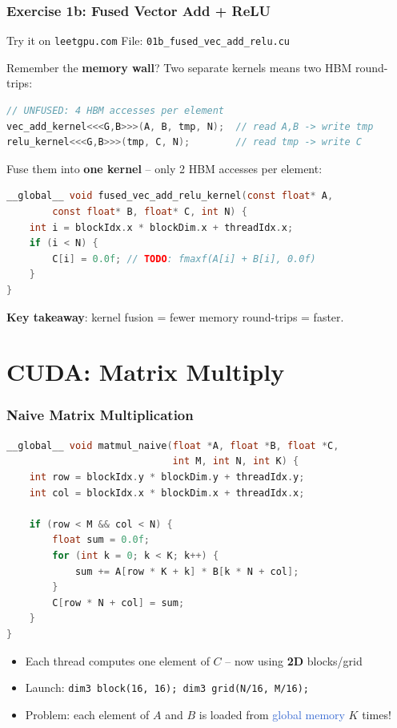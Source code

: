 \documentclass[aspectratio=169]{beamer}
\begin{document}
\begin{frame}[fragile]
	\frametitle{Exercise 1b: Fused Vector Add + ReLU}
	\begin{block}{Try it on \texttt{leetgpu.com}}
		File: \texttt{01b\_fused\_vec\_add\_relu.cu}
	\end{block}
	\vspace{0.3em}
	Remember the \textbf{memory wall}? Two separate kernels means two HBM round-trips:
	\begin{lstlisting}[language=C]
// UNFUSED: 4 HBM accesses per element
vec_add_kernel<<<G,B>>>(A, B, tmp, N);  // read A,B -> write tmp
relu_kernel<<<G,B>>>(tmp, C, N);        // read tmp -> write C
	\end{lstlisting}
	\vspace{0.2em}
	Fuse them into \textbf{one kernel} -- only 2 HBM accesses per element:
	\begin{lstlisting}[language=C]
__global__ void fused_vec_add_relu_kernel(const float* A,
        const float* B, float* C, int N) {
    int i = blockIdx.x * blockDim.x + threadIdx.x;
    if (i < N) {
        C[i] = 0.0f; // TODO: fmaxf(A[i] + B[i], 0.0f)
    }
}
	\end{lstlisting}
	\vspace{0.2em}
	\textbf{Key takeaway}: kernel fusion = fewer memory round-trips = faster.
\end{frame}

\section{CUDA: Matrix Multiply}

\begin{frame}[fragile]
	\frametitle{Naive Matrix Multiplication}
	\begin{lstlisting}[language=C]
__global__ void matmul_naive(float *A, float *B, float *C,
                             int M, int N, int K) {
    int row = blockIdx.y * blockDim.y + threadIdx.y;
    int col = blockIdx.x * blockDim.x + threadIdx.x;

    if (row < M && col < N) {
        float sum = 0.0f;
        for (int k = 0; k < K; k++) {
            sum += A[row * K + k] * B[k * N + col];
        }
        C[row * N + col] = sum;
    }
}
	\end{lstlisting}
	\begin{itemize}
		\item Each thread computes one element of $C$ -- now using \textbf{2D} blocks/grid
		\item Launch: \texttt{dim3 block(16, 16); dim3 grid(N/16, M/16);}
		\item Problem: each element of $A$ and $B$ is loaded from \textcolor{highlight}{global memory} $K$ times!
	\end{itemize}
\end{frame}
\end{document}

